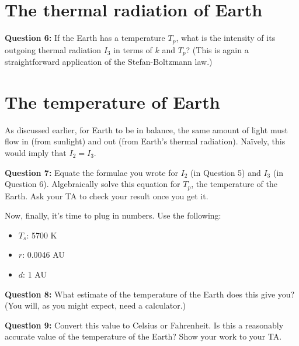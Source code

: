 \documentclass[11pt]{article}
\def\BI{\begin{itemize}}
\def\EI{\end{itemize}}
\begin{document}
\vspace*{3cm}

\hrulefill


\section*{The thermal radiation of Earth}

{\bf Question 6:} If the Earth has a temperature $T_p$, what is the intensity of its outgoing thermal radiation $I_3$ in terms of $k$ and $T_p$? (This is again a straightforward application of the Stefan-Boltzmann law.)

\vspace*{3cm}

\hrulefill

\newpage
\section*{The temperature of Earth}

As discussed earlier, for Earth to be in balance, the same amount of light must flow in (from sunlight) and out (from Earth's thermal radiation). Na\"{i}vely, this would imply that
$I_2=I_3$. 

{\bf Question 7:} Equate the formulae you wrote for $I_2$ (in Question 5) and $I_3$ (in Question 6). Algebraically solve this equation for $T_p$, the temperature of the Earth. Ask your 
TA to check your result once you get it.

\vspace*{5cm}

\hrulefill

Now, finally, it's time to plug in numbers. Use the following:

\BI
\item $T_s$: 5700 K
\item $r$: 0.0046 AU
\item $d$: 1 AU
\EI


{\bf Question 8:} What estimate of the temperature of the Earth does this give you? (You will, as you might expect, need a calculator.)

\vspace*{2cm}

\hrulefill

{\bf Question 9:} Convert this value to Celsius or Fahrenheit. Is this a reasonably accurate value of the temperature of the Earth? Show your work to your TA.

\vspace*{4cm}
\end{document}
